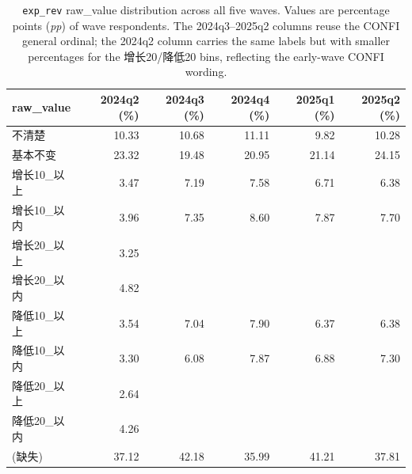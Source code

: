 \documentclass[11pt,letterpaper,english,final]{article}
\begin{document}
\begin{table}[H]
\centering
\small
\setlength{\tabcolsep}{5pt}
\caption{\texttt{exp\_rev} raw\_value distribution across all five waves. Values are percentage points (\textit{pp}) of wave respondents. The 2024q3--2025q2 columns reuse the CONFI general ordinal; the 2024q2 column carries the same labels but with smaller percentages for the 增长20/降低20 bins, reflecting the early-wave CONFI wording.}
\label{tab:exp_rev_dist}
\begin{tabular}{@{}l r r r r r@{}}
\toprule
{raw\_value} & {2024q2 (\%)} & {2024q3 (\%)} & {2024q4 (\%)} & {2025q1 (\%)} & {2025q2 (\%)} \\
\midrule
不清楚        & 10.33 & 10.68 & 11.11 & 9.82  & 10.28 \\
基本不变      & 23.32 & 19.48 & 20.95 & 21.14 & 24.15 \\
增长10\_以上  & 3.47  & 7.19  & 7.58  & 6.71  & 6.38  \\
增长10\_以内  & 3.96  & 7.35  & 8.60  & 7.87  & 7.70  \\
增长20\_以上  & 3.25  &       &       &       &       \\
增长20\_以内  & 4.82  &       &       &       &       \\
降低10\_以上  & 3.54  & 7.04  & 7.90  & 6.37  & 6.38  \\
降低10\_以内  & 3.30  & 6.08  & 7.87  & 6.88  & 7.30  \\
降低20\_以上  & 2.64  &       &       &       &       \\
降低20\_以内  & 4.26  &       &       &       &       \\
\midrule
(缺失)        & 37.12 & 42.18 & 35.99 & 41.21 & 37.81 \\
\bottomrule
\end{tabular}
\end{table}
\end{document}
